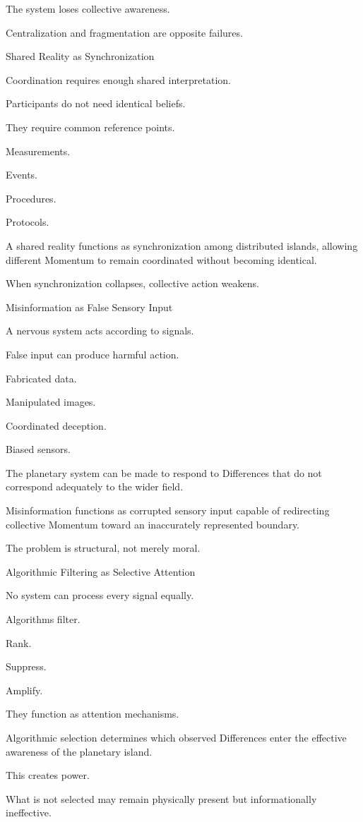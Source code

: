 The system loses collective awareness.

Centralization and fragmentation are opposite failures.

Shared Reality as Synchronization

Coordination requires enough shared interpretation.

Participants do not need identical beliefs.

They require common reference points.

Measurements.

Events.

Procedures.

Protocols.

A shared reality functions as synchronization among distributed islands, allowing different Momentum to remain coordinated without becoming identical.

When synchronization collapses, collective action weakens.

Misinformation as False Sensory Input

A nervous system acts according to signals.

False input can produce harmful action.

Fabricated data.

Manipulated images.

Coordinated deception.

Biased sensors.

The planetary system can be made to respond to Differences that do not correspond adequately to the wider field.

Misinformation functions as corrupted sensory input capable of redirecting collective Momentum toward an inaccurately represented boundary.

The problem is structural, not merely moral.

Algorithmic Filtering as Selective Attention

No system can process every signal equally.

Algorithms filter.

Rank.

Suppress.

Amplify.

They function as attention mechanisms.

Algorithmic selection determines which observed Differences enter the effective awareness of the planetary island.

This creates power.

What is not selected may remain physically present but informationally ineffective.

